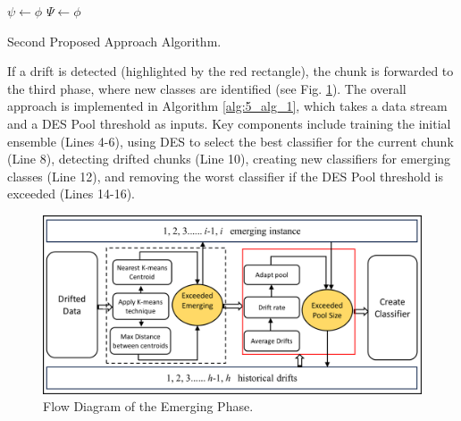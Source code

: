 \begin{algorithm}[H]
	\SetAlgoLined
	\DontPrintSemicolon
	$\psi \gets \phi$\;
	$\Psi \gets \phi$\;
	\;
	\caption{Second Proposed Approach Algorithm.}
	\label{alg:5_alg_1}
\end{algorithm}
If a drift is detected (highlighted by the red rectangle), the chunk is forwarded to the third phase, where new classes are identified (see Fig. \ref{fig:proposal_step_2}). The overall approach is implemented in Algorithm \ref{alg:5_alg_1}, which takes a data stream and a DES Pool threshold as inputs. Key components include training the initial ensemble (Lines 4-6), using DES to select the best classifier for the current chunk (Line 8), detecting drifted chunks (Line 10), creating new classifiers for emerging classes (Line 12), and removing the worst classifier if the DES Pool threshold is exceeded (Lines 14-16).
\begin{figure}[H]
	\centering
	\includegraphics[width=1\linewidth]{5_Emerging/images/pro2.png}
	\caption{Flow Diagram of the Emerging Phase.}
	\label{fig:proposal_step_2}
\end{figure}
